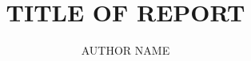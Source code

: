 \title{TITLE OF REPORT}
\author{AUTHOR NAME}
\usepackage{amsmath}
\usepackage{amsfonts}
\usepackage{amssymb}
\usepackage{fancyhdr}
\pagestyle{fancy}
\usepackage{varioref}
\usepackage{color}
\usepackage[pdfborder=0, colorlinks=true, urlcolor=blue, linkcolor=mygrey]{hyperref}
\usepackage[margin=1in,paper=letterpaper,includeheadfoot]{geometry}
